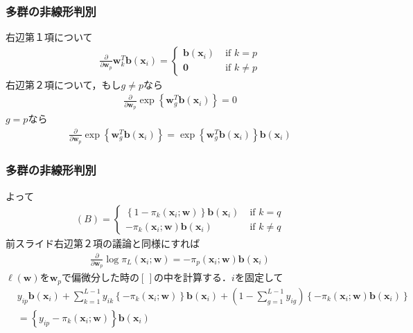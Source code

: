 \documentclass[dvipdfmx,cjk]{beamer}
\theoremstyle{example}
\begin{document}
\begin{frame}
    \frametitle{多群の非線形判別}
    右辺第１項について
    \begin{align*}
        \frac{\partial}{\partial \boldsymbol{w}_p}\boldsymbol{w}_k^T\boldsymbol{b}(\boldsymbol{x}_i)=
        \begin{cases}
            \boldsymbol{b}(\boldsymbol{x}_i)\; & \text{if $k=p$}     \\
            \boldsymbol{0}\;                   & \text{if $k\neq p$}
        \end{cases}
    \end{align*}
    右辺第２項について，もし$g\neq p$なら
    \begin{align*}
        \frac{\partial}{\partial \boldsymbol{w}_p}\exp\left\{\boldsymbol{w}_g^T\boldsymbol{b}(\boldsymbol{x}_i)\right\}=0
    \end{align*}
    $g=p$なら
    \begin{align*}
        \frac{\partial}{\partial \boldsymbol{w}_p}\exp\left\{\boldsymbol{w}_g^T\boldsymbol{b}(\boldsymbol{x}_i)\right\}=\exp \left\{\boldsymbol{w}_g^T\boldsymbol{b}(\boldsymbol{x}_i)\right\}\boldsymbol{b}(\boldsymbol{x}_i)
    \end{align*}
\end{frame}

\begin{frame}
    \frametitle{多群の非線形判別}
    よって
    \begin{align*}
        (B)=
        \begin{cases}
            \left\{1-\pi_k(\boldsymbol{x}_i;\boldsymbol{w})\right\}\boldsymbol{b}(\boldsymbol{x}_i)\; & \text{if $k=q$}      \\
            -\pi_k(\boldsymbol{x}_i;\boldsymbol{w})\boldsymbol{b}(\boldsymbol{x}_i)\;                 & \text{if $k \neq q$}
        \end{cases}
    \end{align*}
    前スライド右辺第２項の議論と同様にすれば
    \begin{align*}
        \frac{\partial}{\partial \boldsymbol{w}_p}\log \pi_L(\boldsymbol{x}_i;\boldsymbol{w})=-\pi_p(\boldsymbol{x}_i;\boldsymbol{w})\boldsymbol{b}(\boldsymbol{x}_i)
    \end{align*}
    $\ell(\boldsymbol{w})$を$\boldsymbol{w}_p$で偏微分した時の$\left[\,\right]$の中を計算する．$i$を固定して
    \begin{align*}
         & y_{ip}\boldsymbol{b}(\boldsymbol{x}_i)+\sum_{k=1}^{L-1}y_{ik}\left\{-\pi_k(\boldsymbol{x}_i;\boldsymbol{w})\right\}\boldsymbol{b}(\boldsymbol{x}_i)+(1-\sum_{g=1}^{L-1}y_{ig})\left\{-\pi_k(\boldsymbol{x}_i;\boldsymbol{w})\boldsymbol{b}(\boldsymbol{x}_i)\right\} \\
         & =\left\{y_{ip}-\pi_k(\boldsymbol{x}_i;\boldsymbol{w})\right\}\boldsymbol{b}(\boldsymbol{x}_i)
    \end{align*}
\end{frame}
\end{document}
